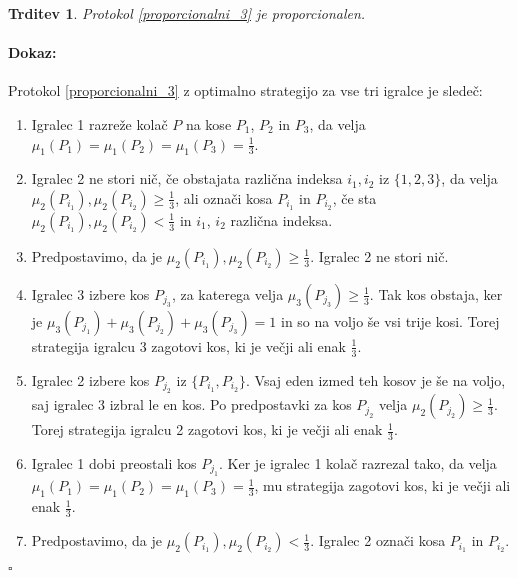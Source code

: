 \documentclass[a4paper, 12pt]{article}
\newtheorem{trditev}{Trditev}
\newenvironment{dokaz}{\paragraph{Dokaz:}}{\hfill$\square$\\}
\begin{document}
	\begin{trditev}
		Protokol \ref{proporcionalni_3} je proporcionalen.
	\end{trditev}

	\begin{dokaz}
		Protokol \ref{proporcionalni_3} z optimalno strategijo za vse tri igralce je sledeč:
		\begin{enumerate}
			
			\item Igralec 1 razreže kolač $P$ na kose $P_1$, $P_2$ in $P_3$, da velja $\mu_1 (P_1) = \mu_1 (P_2) = \mu_1 (P_3) = \frac{1}{3}$.
			
			\item Igralec 2 ne stori nič, če obstajata različna indeksa $i_1, i_2$ iz $\{1, 2, 3\}$, da velja $\mu_2 (P_{i_1}), \mu_2 (P_{i_2}) \geq \frac{1}{3}$, ali označi kosa $P_{i_1}$ in $P_{i_2}$, če sta $\mu_2 (P_{i_1}), \mu_2 (P_{i_2}) < \frac{1}{3}$ in $i_1$, $i_2$ različna indeksa.
			
			\item[] Predpostavimo, da je $\mu_2 (P_{i_1}), \mu_2 (P_{i_2}) \geq \frac{1}{3}$. Igralec 2 ne stori nič.
			
			\setcounter{enumi}{2}
			
			\item \qquad Igralec 3 izbere kos $P_{j_3}$, za katerega velja $\mu_3 (P_{j_3}) \geq \frac{1}{3}$. Tak kos obstaja, ker je $\mu_3 (P_{j_1}) + \mu_3 (P_{j_2}) + \mu_3 (P_{j_3}) = 1$ in so na voljo še vsi trije kosi. Torej strategija igralcu 3 zagotovi kos, ki je večji ali enak $\frac{1}{3}$.
			
			\item \qquad Igralec 2 izbere kos $P_{j_2}$ iz $\{P_{i_1}, P_{i_2}\}$. Vsaj eden izmed teh kosov je še na voljo, saj igralec 3 izbral le en kos. Po predpostavki za kos $P_{j_2}$ velja $\mu_2 (P_{j_2}) \geq \frac{1}{3}$. Torej strategija igralcu 2 zagotovi kos, ki je večji ali enak $\frac{1}{3}$.
			
			\item \qquad Igralec 1 dobi preostali kos $P_{j_1}$. Ker je igralec 1 kolač razrezal tako, da velja $\mu_1 (P_1) = \mu_1 (P_2) = \mu_1 (P_3) = \frac{1}{3}$, mu strategija zagotovi kos, ki je večji ali enak $\frac{1}{3}$. 
			
			\item[] Predpostavimo, da je $\mu_2 (P_{i_1}), \mu_2 (P_{i_2}) < \frac{1}{3}$. Igralec 2 označi kosa $P_{i_1}$ in $P_{i_2}$. 
			
			\setcounter{enumi}{2}
			

\end{enumerate}
\end{dokaz}
\end{document}
